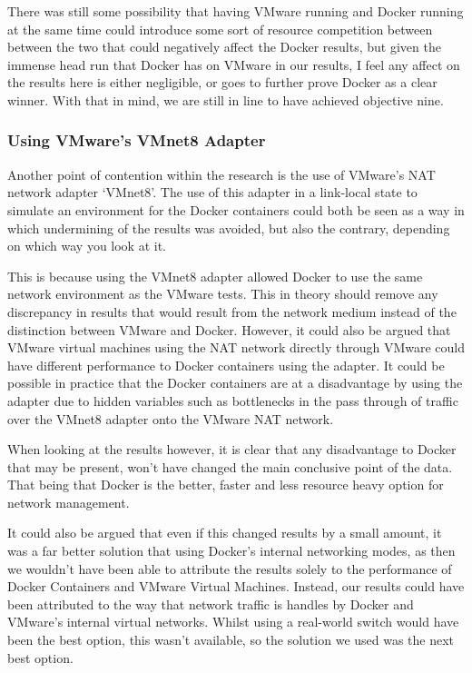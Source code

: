 There was still some possibility that having VMware running and Docker running at the same time could introduce some sort of resource competition between between the two that could negatively affect the Docker results, but given the immense head run that Docker has on VMware in our results, I feel any affect on the results here is either negligible, or goes to further prove Docker as a clear winner. With that in mind, we are still in line to have achieved objective nine.

\subsubsection{Using VMware's VMnet8 Adapter}%
Another point of contention within the research is the use of VMware's NAT network adapter `VMnet8'. The use of this adapter in a link-local state to simulate an environment for the Docker containers could both be seen as a way in which undermining of the results was avoided, but also the contrary, depending on which way you look at it.

This is because using the VMnet8 adapter allowed Docker to use the same network environment as the VMware tests. This in theory should remove any discrepancy in results that would result from the network medium instead of the distinction between VMware and Docker. However, it could also be argued that VMware virtual machines using the NAT network directly through VMware could have different performance to Docker containers using the adapter. It could be possible in practice that the Docker containers are at a disadvantage by using the adapter due to hidden variables such as bottlenecks in the pass through of traffic over the VMnet8 adapter onto the VMware NAT network.

When looking at the results however, it is clear that any disadvantage to Docker that may be present, won't have changed the main conclusive point of the data. That being that Docker is the better, faster and less resource heavy option for network management.

It could also be argued that even if this changed results by a small amount, it was a far better solution that using Docker's internal networking modes, as then we wouldn't have been able to attribute the results solely to the performance of Docker Containers and VMware Virtual Machines. Instead, our results could have been attributed to the way that network traffic is handles by Docker and VMware's internal virtual networks. Whilst using a real-world switch would have been the best option, this wasn't available, so the solution we used was the next best option.

